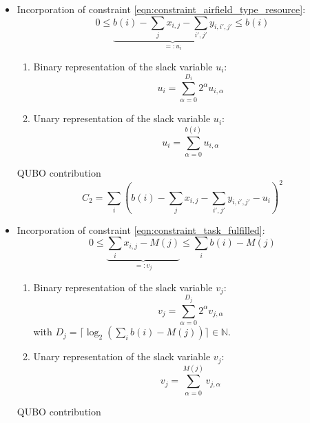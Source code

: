 \documentclass{article}
\begin{document}
\begin{itemize}
\item Incorporation of constraint \eqref{eqn:constraint_airfield_type_resource}:
    \begin{equation*}
        0 \leq \underbrace{b(i) - \sum_j x_{i,j} - \sum_{i', j'} y_{i, i', j'}}_{=:u_i} \leq b(i)
    \end{equation*}
    \begin{enumerate}
        \item 
        Binary representation of the slack variable $u_i$:
        \begin{equation*}
            u_{i} = \sum_{\alpha = 0}^{D_i} 2^\alpha u_{i, \alpha}
        \end{equation*}
        \item 
        Unary representation of the slack variable $u_i$:
        \begin{equation*}
            u_{i} = \sum_{\alpha = 0}^{b(i)} u_{i, \alpha}
        \end{equation*}
    \end{enumerate}
    QUBO contribution
    \begin{equation*}
        C_2 = \sum_i \left( b(i) - \sum_j x_{i,j} - \sum_{i', j'} y_{i, i', j'} - u_i \right)^2
    \end{equation*}
\item Incorporation of constraint \eqref{eqn:constraint_task_fulfilled}:
    \begin{equation*}
        0 \leq \underbrace{\sum_i x_{i,j} - M(j)}_{=:v_j} \leq \sum_i b(i) - M(j)
    \end{equation*}
    \begin{enumerate}
        \item 
        Binary representation of the slack variable $v_j$:
        \begin{equation*}
            v_{j} = \sum_{\alpha = 0}^{D_j} 2^\alpha v_{j, \alpha} 
        \end{equation*}
        with $D_j = \lceil \log_2 \left( \sum_i b(i) - M(j) \right) \rceil \in \mathbb{N}$.
        \item 
        Unary representation of the slack variable $v_j$:
        \begin{equation*}
            v_{j} = \sum_{\alpha = 0}^{M(j)} v_{j, \alpha}
        \end{equation*}
    \end{enumerate}
    QUBO contribution
    \begin{equation*}

\end{equation*}
\end{itemize}
\end{document}

